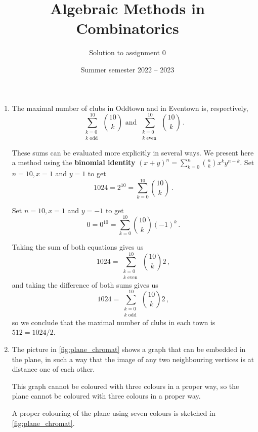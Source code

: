 \documentclass[kulak]{tplt}
\title{Algebraic Methods in Combinatorics}
\author{Solution to assignment 0}
\date{Summer semester 2022 -- 2023}
\theoremstyle{definition}
\begin{document}
\maketitle
\begin{enumerate}
\item 

The maximal number of clubs in Oddtown and in Eventown is, respectively, 
$$\sum_{\substack{k=0\\ k \text{ odd }}}^{10} \binom{10}{k} \text{ and }\sum_{\substack{k=0\\ k \text{ even }}}^{10} \binom{10}{k}\, . $$

These sums can be evaluated more explicitly in several ways.
We present here a method using the \textbf{binomial identity} $(x+y)^n = \sum_{k=0}^n \binom{n}{k} x^ky^{n-k}$.
Set $n = 10, x = 1$ and $y = 1$ to get
$$ 1024 = 2^{10} = \sum_{k = 0}^{10}\binom{10}{k}\, . $$

Set $n = 10, x = 1$ and $y = -1$ to get
$$ 0 = 0^{10} = \sum_{k = 0}^{10}\binom{10}{k}(-1)^k \, . $$

Taking the sum of both equations gives us
$$ 1024 = \sum_{\substack{k=0\\ k \text{ even }}}^{10} \binom{10}{k}2\, ,$$
and taking the difference of both sums gives us
$$ 1024 = \sum_{\substack{k=0\\ k \text{ odd }}}^{10} \binom{10}{k}2\, ,$$
so we conclude that the maximal number of clubs in each town is $512 = 1024 / 2$.


\item 
The picture in \cref{fig:plane_chromat} shows a graph that can be embedded in the plane, in such a way that the image of any two neighbouring vertices is at distance one of each other.

This graph cannot be coloured with three colours in a proper way, so the plane cannot be coloured with three colours in a proper way.

A proper colouring of the plane using seven colours is sketched in \cref{fig:plane_chromat}.



\end{enumerate}
\end{document}

